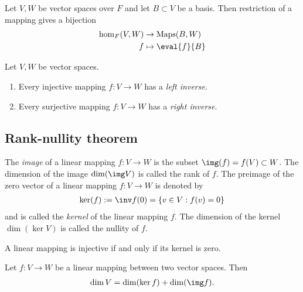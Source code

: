 \documentclass{article}
\begin{document}
\begin{lemma}[Notes 1.7.8]
    Let $V,W$ be vector spaces over $F$ and let $B\subset V$ be a basis. Then
    restriction of a mapping gives a bijection
    \begin{align*}
        \hom_F(V,W) & \to \text{Maps}(B,W) \\
        f           & \mapsto \eval{f}{B}
    \end{align*}
\end{lemma}

\begin{proposition}[Notes 1.7.9]
    Let $V,W$ be vector spaces.
    \begin{enumerate}
        \item Every injective mapping $f:V\to W$ has a \emph{left inverse}.
        \item Every surjective mapping $f:V\to W$ has a \emph{right inverse}.
    \end{enumerate}
\end{proposition}

\subsection{Rank-nullity theorem}

\begin{definition}
    The \emph{image} of a linear mapping $f:V\to W$ is the subset $\img(f)=f(V)\subset W$.
    The dimension of the image $\dim(\img V)$ is called the rank of $f$.
    The preimage of the zero vector of a linear mapping $f:V\to W$ is denoted by
    \begin{align*}
        \ker(f):=\inv f(0)=\{v\in V : f(v)=0\}
    \end{align*}
    and is called the \emph{kernel} of the linear mapping $f$. The dimension of the
    kernel $\dim(\ker V)$ is called the nullity of $f$.
\end{definition}

\begin{lemma}[Notes 1.8.2]
    A linear mapping is injective if and only if its kernel is zero.
\end{lemma}

\begin{theorem}
    Let $f:V\to W$ be a linear mapping between two vector spaces. Then
    \begin{align*}
        \dim V = \dim(\ker f) + \dim(\img f).
    \end{align*}
\end{theorem}
\end{document}
